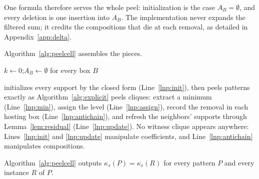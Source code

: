One formula therefore serves the whole peel: initialization is the case $A_B=\emptyset$, and every deletion is one insertion into $A_B$.
%
The implementation never expands the filtered sum; it credits the compositions that die at each removal, as detailed in Appendix~\ref{app:delta}.

Algorithm~\ref{alg:peelcell} assembles the pieces.

\begin{algorithm}[t]
\caption{\peelcell: peel one cell in the quotient.}
\label{alg:peelcell}
\algfontsize
{}
$k \leftarrow 0$;\quad $A_B \leftarrow \emptyset$ for every box $B$\label{lnp:reset}\;
\end{algorithm}

\peelcell{} initializes every support by the closed form (Line~\ref{lnp:init}), then peels patterns exactly as Algorithm~\ref{alg:explicit} peels cliques: extract a minimum (Line~\ref{lnp:min}), assign the level (Line~\ref{lnp:assign}), record the removal in each hosting box (Line~\ref{lnp:antichain}), and refresh the neighbors' supports through Lemma~\ref{lem:residual} (Line~\ref{lnp:update}).
%
No witness clique appears anywhere: Lines~\ref{lnp:init} and \ref{lnp:update} manipulate coefficients, and Line~\ref{lnp:antichain} manipulates compositions.

\begin{theorem}\label{thm:orbit}
Algorithm~\ref{alg:peelcell} outputs $\kappa_s(P)=\kappa_s(R)$ for every pattern $P$ and every instance $R$ of $P$.
\end{theorem}

